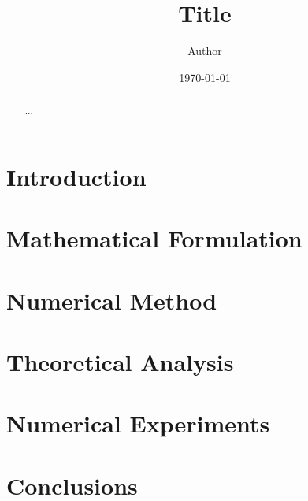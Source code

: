 \documentclass[12pt]{article}
\title{Title}
\author{Author}
\date{\today}
\begin{document}
\maketitle

\begin{abstract}
...
\end{abstract}

\section{Introduction}

\section{Mathematical Formulation}

\section{Numerical Method}

\section{Theoretical Analysis}

\section{Numerical Experiments}

\section{Conclusions}



\end{document}

